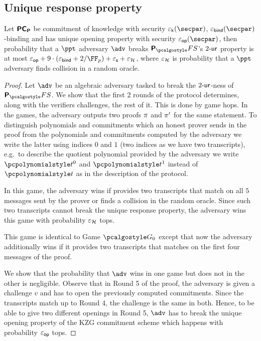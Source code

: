 \subsection{Unique response property}
\begin{lemma}
	\label{lem:plonkprot_ur}
  Let $\bm{\mathsf{PC}}_{\bm{\mathsf{P}}}$ be commitment of knowledge with security $\epsk(\secpar)$,
  $\epsbind(\secpar)$-binding and has unique opening property with security
  $\epsop(\secpar)$, then probability that a $\ppt$ adversary $\adv$ breaks
  $\plonkprotfs$'s ${2\text{-}\mathsf{ur}}$ property is at most
  $\epsop + 9 \cdot (\epsbind + \infrac{2}{\FF_p}) + \epss + \epsro$, where
  $\varepsilon_{\mathcal{H}}$ is probability that a $\ppt$ adversary finds collision in a random
  oracle.
\end{lemma}
\begin{proof}
  Let
  $\adv$
  be an algebraic adversary tasked to break the ${2\text{-}\mathsf{ur}}$-ness of
  $\plonkprotfs$. We show that the first 2 rounds of the protocol determines,
  along with the verifiers challenges, the rest of it.  This is done by game
  hops. In the games, the adversary outputs two proofs $\pi$ and
  $\pi'$ for the same statement.  To distinguish polynomials and
  commitments which an honest prover sends in the proof from the polynomials and
  commitments computed by the adversary we write the latter using indices $0$
  and $1$ (two indices as we have two transcripts), e.g.~to describe the
  quotient polynomial provided by the adversary we write $\p{t}^0$ and $\p{t}^1$
  instead of $\p{t}$ as in the description of the protocol.

   In this game, the adversary wins if provides two
  transcripts that match on all $5$ messages sent by the prover or finds a
  collision in the random oracle. Since such two transcripts cannot break the
  unique response property, the adversary wins this game with probability
  $\varepsilon_{\mathcal{H}}$ tops.

   This game is identical to Game $\game{0}$ except that now the
  adversary additionally wins if it provides two transcripts that matches on the first four
  messages of the proof.

   We show that the probability that $\adv$
  wins in one game but does not in the other is negligible.  Observe that in
  Round 5 of the proof, the adversary is given a challenge $v$ and has to open
  the previously computed commitments. Since the transcripts match up to Round
  4, the challenge is the same in both. Hence, to be able to give two different
  openings in Round 5, $\adv$ has to break the unique opening property of the
  KZG commitment scheme which happens with probability $\varepsilon_{\mathsf{op}}$ tops.


\end{proof}
